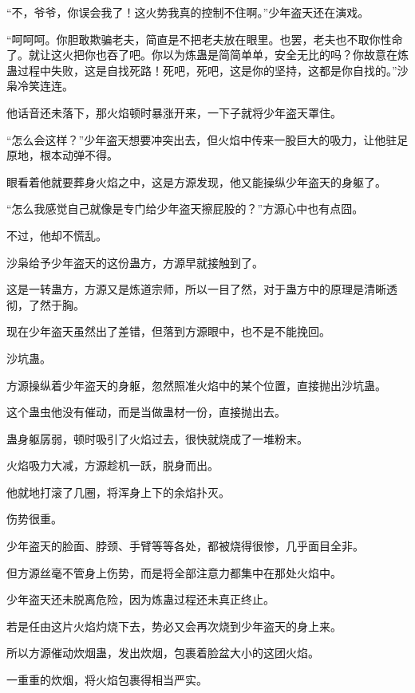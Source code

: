 
\begin{this_body}



“不，爷爷，你误会我了！这火势我真的控制不住啊。”少年盗天还在演戏。

“呵呵呵。你胆敢欺骗老夫，简直是不把老夫放在眼里。也罢，老夫也不取你性命了。就让这火把你也吞了吧。你以为炼蛊是简简单单，安全无比的吗？你故意在炼蛊过程中失败，这是自找死路！死吧，死吧，这是你的坚持，这都是你自找的。”沙枭冷笑连连。

他话音还未落下，那火焰顿时暴涨开来，一下子就将少年盗天罩住。

“怎么会这样？”少年盗天想要冲突出去，但火焰中传来一股巨大的吸力，让他驻足原地，根本动弹不得。

眼看着他就要葬身火焰之中，这是方源发现，他又能操纵少年盗天的身躯了。

“怎么我感觉自己就像是专门给少年盗天擦屁股的？”方源心中也有点囧。

不过，他却不慌乱。

沙枭给予少年盗天的这份蛊方，方源早就接触到了。

这是一转蛊方，方源又是炼道宗师，所以一目了然，对于蛊方中的原理是清晰透彻，了然于胸。

现在少年盗天虽然出了差错，但落到方源眼中，也不是不能挽回。

沙坑蛊。

方源操纵着少年盗天的身躯，忽然照准火焰中的某个位置，直接抛出沙坑蛊。

这个蛊虫他没有催动，而是当做蛊材一份，直接抛出去。

蛊身躯孱弱，顿时吸引了火焰过去，很快就烧成了一堆粉末。

火焰吸力大减，方源趁机一跃，脱身而出。

他就地打滚了几圈，将浑身上下的余焰扑灭。

伤势很重。

少年盗天的脸面、脖颈、手臂等等各处，都被烧得很惨，几乎面目全非。

但方源丝毫不管身上伤势，而是将全部注意力都集中在那处火焰中。

少年盗天还未脱离危险，因为炼蛊过程还未真正终止。

若是任由这片火焰灼烧下去，势必又会再次烧到少年盗天的身上来。

所以方源催动炊烟蛊，发出炊烟，包裹着脸盆大小的这团火焰。

一重重的炊烟，将火焰包裹得相当严实。


\end{this_body}
